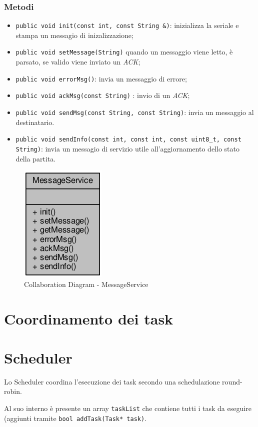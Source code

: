 \subsubsection{Metodi}
\begin{itemize}
	\item \texttt{public void init(const int, const String \&)}: inizializza la seriale e stampa un messagio di inizalizzazione;
	\item \texttt{public void setMessage(String)}  quando un messaggio viene letto, è parsato, se valido viene inviato un \textit{ACK};
	\item \texttt{public void errorMsg()}: invia un messaggio di errore;
	\item \texttt{public void ackMsg(const String)} : invio di un \textit{ACK};
	\item \texttt{public void sendMsg(const String, const String)}: invia un messaggio al destinatario.
	\item \texttt{public void sendInfo(const int, const int, const uint8\_t, const String)}: invia un messagio di servizio utile all'aggiornamento dello stato della partita.
\end{itemize}
\begin{figure}[!ht]
	\centering
	\includegraphics[scale=.5]{img/UML/CollaborationDiagram/MessageService.png}
	\caption{Collaboration Diagram - MessageService}
\end{figure}

\newpage
\section{Coordinamento dei task}
\section{Scheduler}
Lo Scheduler coordina l'esecuzione dei task secondo una schedulazione round-robin.

Al suo interno è presente un array \texttt{taskList} che contiene tutti i task da eseguire (aggiunti tramite \texttt{bool addTask(Task* task)}.

